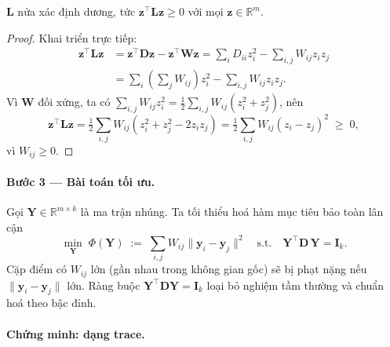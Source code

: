 \begin{lemma}
$\mathbf{L}$ nửa xác định dương, tức $\mathbf{z}^\top\mathbf{L}\mathbf{z}
\ge 0$ với mọi $\mathbf{z}\in\mathbb{R}^m$.
\end{lemma}
\begin{proof}
Khai triển trực tiếp:
\begin{align*}
  \mathbf{z}^\top\mathbf{L}\mathbf{z}
  &= \mathbf{z}^\top\mathbf{D}\mathbf{z} - \mathbf{z}^\top\mathbf{W}\mathbf{z}
   = \sum_i D_{ii}z_i^2 - \sum_{i,j} W_{ij}z_iz_j \\
  &= \sum_i\!\left(\sum_j W_{ij}\right)z_i^2 - \sum_{i,j}W_{ij}z_iz_j.
\end{align*}
Vì $\mathbf{W}$ đối xứng, ta có $\sum_{i,j}W_{ij}z_i^2
= \tfrac{1}{2}\sum_{i,j}W_{ij}(z_i^2+z_j^2)$, nên
\begin{equation*}
  \mathbf{z}^\top\mathbf{L}\mathbf{z}
  = \tfrac{1}{2}\sum_{i,j}W_{ij}(z_i^2 + z_j^2 - 2z_iz_j)
  = \tfrac{1}{2}\sum_{i,j}W_{ij}(z_i - z_j)^2 \;\ge\; 0,
\end{equation*}
vì $W_{ij}\ge 0$.
\end{proof}
 
\paragraph{Bước 3 — Bài toán tối ưu.}
Gọi $\mathbf{Y} \in \mathbb{R}^{m \times k}$ là ma trận nhúng.
Ta tối thiểu hoá hàm mục tiêu bảo toàn lân cận
\begin{equation}\label{eq:le_obj}
  \min_{\mathbf{Y}}\;
  \Phi(\mathbf{Y}) \;:=\; \sum_{i,j} W_{ij}\|\mathbf{y}_i - \mathbf{y}_j\|^2
  \quad \text{s.t.} \quad
  \mathbf{Y}^\top \mathbf{D}\, \mathbf{Y} = \mathbf{I}_k.
\end{equation}
Cặp điểm có $W_{ij}$ lớn (gần nhau trong không gian gốc) sẽ bị phạt nặng
nếu $\|\mathbf{y}_i - \mathbf{y}_j\|$ lớn.
Ràng buộc $\mathbf{Y}^\top\mathbf{D}\mathbf{Y}=\mathbf{I}_k$ loại bỏ nghiệm
tầm thường và chuẩn hoá theo bậc đỉnh.
 
\paragraph{Chứng minh: dạng trace.}
 

